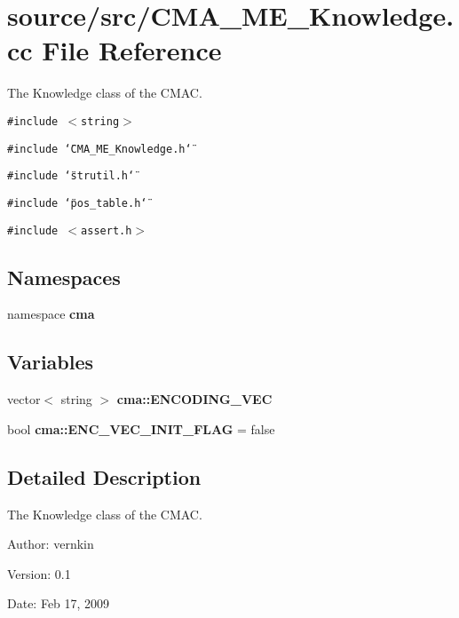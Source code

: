 \section{source/src/CMA\_\-ME\_\-Knowledge.cc File Reference}
\label{CMA__ME__Knowledge_8cc}
The Knowledge class of the CMAC. 

{\tt \#include $<$string$>$}\par
{\tt \#include \char`\"{}CMA\_\-ME\_\-Knowledge.h\char`\"{}}\par
{\tt \#include \char`\"{}strutil.h\char`\"{}}\par
{\tt \#include \char`\"{}pos\_\-table.h\char`\"{}}\par
{\tt \#include $<$assert.h$>$}\par
\subsection*{Namespaces}
\begin{CompactItemize}
\item 
namespace \textbf{cma}
\end{CompactItemize}
\subsection*{Variables}
\begin{CompactItemize}
\item 
vector$<$ string $>$ \textbf{cma::ENCODING\_\-VEC}\label{namespacecma_4a7190ab59f2fe11228c3043dc3d3628}

\item 
bool \textbf{cma::ENC\_\-VEC\_\-INIT\_\-FLAG} = false\label{namespacecma_c6b468e528120ab09e84acb8d18cb771}

\end{CompactItemize}


\subsection{Detailed Description}
The Knowledge class of the CMAC. 

\begin{Desc}
\item[Author:]vernkin \end{Desc}
\begin{Desc}
\item[Version:]0.1 \end{Desc}
\begin{Desc}
\item[Date:]Feb 17, 2009 \end{Desc}
